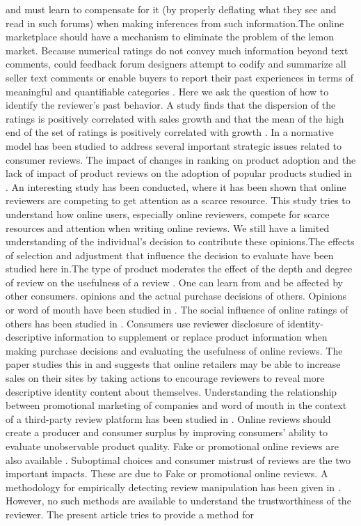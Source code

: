 \documentclass[conference]{IEEEtran}
\theoremstyle{plain}
\theoremstyle{definition}
\theoremstyle{remark}
\begin{document}
and must learn to compensate for it (by properly deflating what they see and read in such forums) when making inferences from such information.The online marketplace should have a mechanism to eliminate the problem of the lemon market. Because numerical ratings do not convey much information beyond text comments, could feedback forum designers attempt to codify and summarize all seller text comments or enable buyers to report their past experiences in terms of meaningful and quantifiable categories \citep{pavlou2006nature}. Here we ask the question of how to identify the reviewer's past behavior. A study finds that the dispersion of the ratings is positively correlated with sales growth and that the mean of the high end of the set of ratings is positively correlated with growth \citep{clemons2006online}. In \citep{chen2008online} a normative model has been studied to address several important strategic issues related to consumer reviews. The impact of changes in ranking on product adoption and the lack of impact of product reviews on the adoption of popular products studied in \citep{duan2009informational}. An interesting study has been conducted, where it has been shown that online reviewers are competing to get attention as a scarce resource. This study tries to understand how online users, especially online reviewers, compete for scarce resources and attention when writing online reviews\citep{shen2013competing}. We still have a limited understanding of the individual's decision to contribute these opinions.The effects of selection and adjustment that influence the decision to evaluate have been studied here in\citep{moe2012online}.The type of product moderates the effect of the depth and degree of review on the usefulness of a review \citep{mudambi2010research,chua2015helpfulness}. One can learn from and be affected by other consumers. opinions and the actual purchase decisions of others. Opinions or word of mouth have been studied in \citep{chen2011online}. The social influence of online ratings of others has been studied in \citep{sridhar2012social,shen2016herd}. Consumers use reviewer disclosure of identity-descriptive information to supplement or replace product information when making purchase decisions and evaluating the usefulness of online reviews. The paper studies this in \citep{forman2008examining} and suggests that online retailers may be able to increase sales on their sites by taking actions to encourage reviewers to reveal more descriptive identity content about themselves. Understanding the relationship between promotional marketing of companies and word of mouth in the context of a third-party review platform has been studied in \citep{lu2013promotional}. Online reviews should create a producer and consumer surplus by improving consumers' ability to evaluate unobservable product quality. Fake or promotional online reviews are also available \citep{banerjee2017deceived}. Suboptimal choices and consumer mistrust of reviews are the two important impacts. These are due to Fake or promotional online reviews. A methodology for empirically detecting review manipulation has been given in \citep{mayzlin2014promotional}. However, no such methods are available to understand the trustworthiness of the reviewer. The present article tries to provide a method for 
\end{document}
